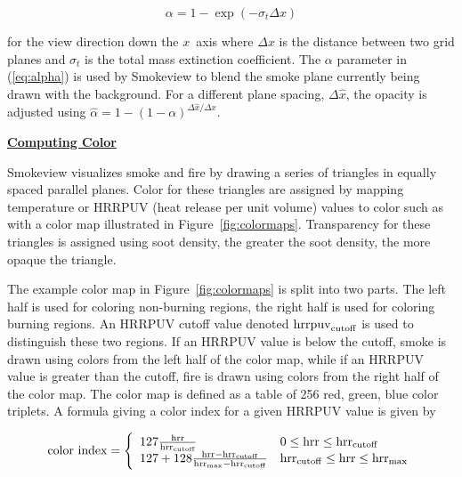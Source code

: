 \documentclass[11pt]{article}
\newcommand{\ssubsection}[1]{\underline{\bf #1}}
\begin{document}
\begin{equation}
\label{eq:alpha}
\alpha=1-\exp(-\sigma_t\Delta x)
\end{equation}

\noindent for the view direction down the $x$~axis
where $\Delta x$ is the distance between two grid planes and
$\sigma_t$ is the total mass extinction
coefficient.
The $\alpha$ parameter in (\ref{eq:alpha}) is used by Smokeview
to blend the smoke plane currently being drawn with the
background. For a different plane spacing, $\Delta \hat{x}$,
the opacity is adjusted using $\hat{\alpha}=1-(1-\alpha)^{\Delta \hat{x}/\Delta x}$.


\ssubsection{Computing Color}

Smokeview visualizes smoke and fire by drawing a series of triangles in equally spaced parallel planes.
Color for these triangles are assigned by mapping temperature or HRRPUV (heat release per unit volume)
values
to color such as with a color map illustrated in Figure~\ref{fig:colormaps}.
Transparency for these triangles is assigned using soot density, the greater the soot density,
the more opaque the triangle.

The example color map in Figure~\ref{fig:colormaps} is split into two parts.  The left half is used
for coloring non-burning regions, the right half is used for coloring burning regions.
An HRRPUV cutoff value denoted ${\rm hrrpuv}_{\rm cutoff}$ is used to
distinguish these two regions.
If an HRRPUV value is below the cutoff,
smoke is drawn using colors from the left half of the color map, while if an HRRPUV value is
greater than the cutoff,
fire is drawn using colors from the right half of the color map.  The color map is defined as a table
of 256 red, green, blue color triplets.  A formula giving a color index for a given HRRPUV value is given by

\newcommand{\hrr}{{\rm hrr}}
\newcommand{\hrrcutoff}{{\rm hrr}_{\rm cutoff}}
\newcommand{\hrrmax}{{\rm hrr}_{\rm max}}

\begin{eqnarray}
\mbox{color index}=\left\{
\begin{array}{ll}
  127\frac{\hrr}{\hrrcutoff} & 0 \le \hrr \le \hrrcutoff \\
  127 + 128\frac{\hrr-\hrrcutoff}{\hrrmax-\hrrcutoff} & \hrrcutoff \le \hrr \le \hrrmax
\end{array}
\right.
\end{eqnarray}
\end{document}
